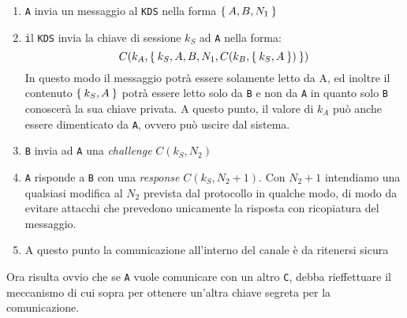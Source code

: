 \begin{enumerate}
\item \texttt A invia un messaggio al \texttt{KDS} nella forma $\Set{A,B,N_1}$
\item \texttt il \texttt{KDS} invia la chiave di sessione $k_S$ ad \texttt A nella forma:
	\[C(k_A,\Set{k_S,A,B,N_1,C(k_B,\Set{k_S,A})})\]
	In questo modo il messaggio potrà essere solamente letto da A, ed inoltre
	il contenuto $\Set{k_S,A}$ potrà essere letto solo da \texttt B e non da \texttt A
	in quanto solo \texttt B conoscerà la sua chiave privata. A questo punto,
	il valore di $k_A$ può anche essere dimenticato da \texttt A, ovvero può
	uscire dal sistema.
\item \texttt B invia ad \texttt A una \textit{challenge} $C(k_S,N_2)$
\item \texttt A risponde a \texttt B con una \textit{response} $C(k_S,N_2+1)$. Con $N_2+1$ intendiamo una qualsiasi
	modifica al $N_2$ prevista dal protocollo in qualche modo, di modo da
	evitare attacchi che prevedono unicamente la risposta con ricopiatura
	del messaggio.
\item A questo punto la comunicazione all'interno del canale è da ritenersi sicura
\end{enumerate}

Ora risulta ovvio che se \texttt A vuole comunicare con un altro \texttt C, debba rieffettuare
il meccanismo di cui sopra per ottenere un'altra chiave segreta per la comunicazione.

